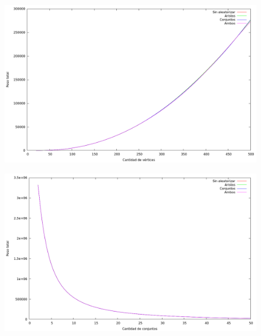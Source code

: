 \vspace*{0.5cm}

\vspace*{0.5cm}

\begin{figure}[h]
  \begin{center}
    \includegraphics[scale=0.35]{imagenes/grasp-local-n-peso.png}
  \end{center}
\end{figure}

\vspace*{0.5cm}

\vspace*{0.5cm}

\begin{figure}[h]
  \begin{center}
    \includegraphics[scale=0.35]{imagenes/grasp-local-k-peso.png}
  \end{center}
\end{figure}

